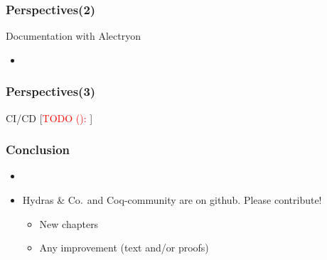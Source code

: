 \documentclass[10pt]{beamer}
\newcommand{\TODO}[2][]{[\textcolor{red}{TODO (#1):} \emph{#2}]}
\newcommand{\community}{Coq-community\xspace}
\newcommand{\Hydras}{Hydras \& Co$\text.$\xspace}
\begin{document}
\begin{frame}
  \frametitle{Perspectives(2)}
  \begin{block}{Documentation with Alectryon}
    \begin{itemize}
    \item \TODO{}{}
    \end{itemize}
  \end{block}
\end{frame}
\begin{frame}
  \frametitle{Perspectives(3)}
  \begin{block}{CI/CD}
     \TODO{}{}
  \end{block}
\end{frame}

\begin{frame}
  \frametitle{Conclusion}
  \begin{block}{}
    \begin{itemize}
    \item \TODO{}{}
    \item \Hydras and \community are on github. Please contribute!
      \begin{itemize}
    \item New chapters
    \item Any improvement (text and/or proofs)
    \end{itemize} 
    \end{itemize}
 \end{block}

\end{frame}
\end{document}
